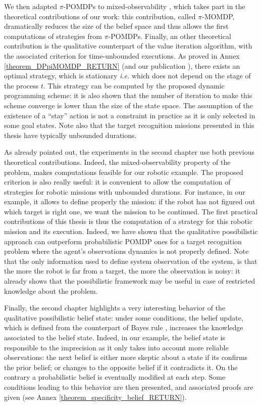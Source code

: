 We then adapted $\pi$-POMDPs 
to mixed-observability \cite{OngShaoHsuWee-IJRR10},
which takes part in the theoretical contributions of our work:
this contribution, called $\pi$-MOMDP, 
dramatically reduces the size of the belief space 
and thus allows the first computations of strategies from $\pi$-POMDPs. 
Finally, an other theoretical contribution 
is the qualitative counterpart 
of the value iteration algorithm,
with the associated criterion 
for time-unbounded executions. 
As proved in Annex \ref{theorem_DPpiMOMDP_RETURN}
(and our publication \cite{Drougard13}), 
there exists an optimal strategy, 
which is stationary 
\textit{i.e.} which does not depend on the stage of the process $t$. 
This strategy can be computed 
by the proposed dynamic programming scheme: 
it is also shown that 
the number of iteration 
to make this scheme converge 
is lower than the size of the state space.
The assumption of the existence of a ``stay'' action
is not a constraint in practice
as it is only selected 
in some goal states.
Note also that the target recognition missions 
presented in this thesis 
have typically unbounded durations.

As already pointed out,
the experiments in the second chapter 
use both previous theoretical contributions.
Indeed, the mixed-observability property of the problem,
makes computations feasible for our robotic example.
The proposed criterion is also really useful: 
it is convenient to allow 
the computation of strategies 
for robotic missions 
with unbounded durations.
For instance, in our example, 
it allows to define properly the mission: 
if the robot has not figured out 
which target is right one,
we want the mission to be continued.
The first practical contributions of this thesis 
is thus the computation of a strategy
for this robotic mission and its execution.
Indeed, we have shown 
that the qualitative possibilistic approach 
can outperform probabilistic POMDP ones 
for a target recognition problem 
where the agent's observations dynamics 
is not properly defined.
Note that the only information used 
to define system observation of the system,
is that the more the robot is far from a target, 
the more the observation is noisy:
it already shows that the possibilistic framework
may be useful in case of restricted knowledge 
about the problem.


Finally, the second chapter highlights 
a very interesting behavior 
of the qualitative possibilistic belief state:
under some conditions, 
the belief update, 
which is defined from the counterpart of Bayes rule \cite{Dubois199023},
increases the knowledge associated to the belief state.
Indeed, in our example, 
the belief state is responsible to the imprecision 
as it only takes into account 
more reliable observations:
the next belief is either more skeptic 
about a state if its confirms the prior belief; 
or changes to the opposite belief if it contradicts it.
On the contrary a probabilistic belief 
is eventually modified at each step. 
Some conditions leading to this behavior 
are then presented,
and associated proofs are given 
(see Annex \ref{theorem_specificity_belief_RETURN}).

